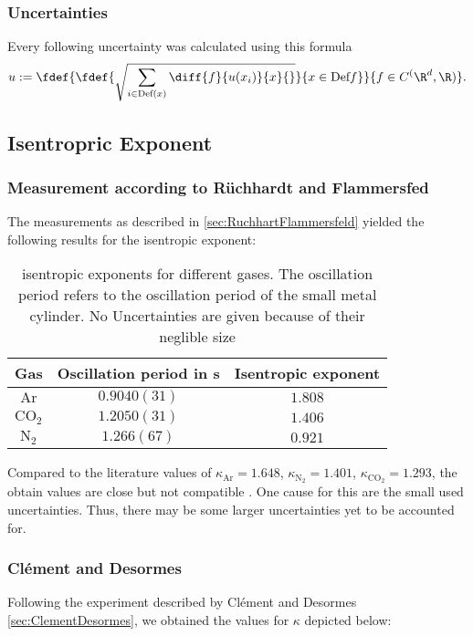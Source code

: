 \documentclass[../main.tex]{subfiles}
\begin{document}
    \subsubsection*{Uncertainties}
        Every following uncertainty was calculated using this formula
        \[u:=\fdef{\fdef{\sqrt{\sum_{i\in\text{Def}(x)}\diff{f}{u(x_i)}{x}{}}}{x\in\text{Def}{f}}}{f\in C^(\R^d,\R)}.\]
		        
        
    \subsection{Isentropric Exponent}
        \subsubsection*{Measurement according to Rüchhardt and Flammersfed}
            The measurements as described in \ref{sec:RuchhartFlammersfeld} yielded the following results for the isentropic exponent:

            \begin{table}[H]
                \centering
                \begin{tabular}{c|c|c}
                    \textbf{Gas} & \textbf{Oscillation period in s} & \textbf{Isentropic exponent}\\
                    \hline
                    $\text{Ar}$ & $0.9040(31)$ & $1.808$\\
                    $\text{CO}_2$ & $1.2050(31)$ & $1.406$\\
                    $\text{N}_2$ & $1.266(67)$ & $0.921$\\
                \end{tabular}
                \caption{isentropic exponents for different gases. The oscillation period refers to the oscillation period of the small metal cylinder. No Uncertainties are given because of their neglible size}
                \label{fig:KappaRuchhardtFlammersfeld}
            \end{table}

            \noindent Compared to the literature values of $\kappa_{\text{Ar}}=1.648$, $\kappa_{\text{N}_2}=1.401$, $\kappa_{\text{CO}_2}=1.293$, the obtain values are close but not compatible \cite[p.258]{skript}. One cause for this are the small used uncertainties. Thus, there may be some larger uncertainties yet to be accounted for.

        \subsubsection*{Clément and Desormes}
            Following the experiment described by Clément and Desormes \ref{sec:ClementDesormes}, we obtained the values for $\kappa$ depicted below:
            
\end{document}
